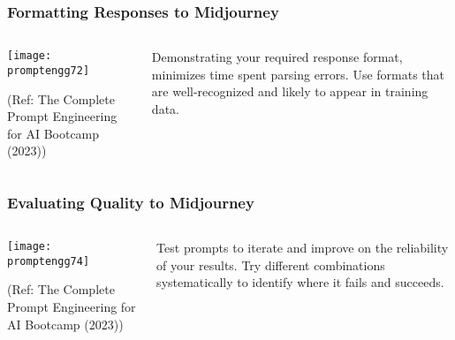\begin{frame}[fragile]\frametitle{Formatting Responses to Midjourney}


\begin{columns}
    \begin{column}[T]{0.6\linewidth}
		\begin{center}
		\texttt{[image: promptengg72]}

		{\tiny (Ref: The Complete Prompt Engineering for AI Bootcamp (2023))}
		\end{center}	
    \end{column}
    \begin{column}[T]{0.4\linewidth}
		Demonstrating your required response format, minimizes time spent parsing errors. 
		Use formats that are well-recognized and likely to appear in training data.
    \end{column}
  \end{columns}
\end{frame}

\begin{frame}[fragile]\frametitle{Evaluating Quality to Midjourney}


\begin{columns}
    \begin{column}[T]{0.6\linewidth}
		\begin{center}
		\texttt{[image: promptengg74]}

		{\tiny (Ref: The Complete Prompt Engineering for AI Bootcamp (2023))}
		\end{center}	
    \end{column}
    \begin{column}[T]{0.4\linewidth}
		Test prompts to iterate and improve on the reliability of your results.
		Try different combinations systematically to identify where it fails and succeeds.
    \end{column}
  \end{columns}
\end{frame}

